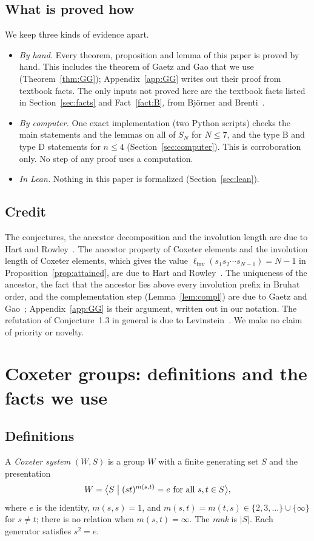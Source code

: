 \documentclass[11pt]{amsart}
\theoremstyle{definition}
\theoremstyle{remark}
\numberwithin{equation}{section}
\newcommand{\linv}{\ell_{\mathrm{inv}}}
\newcommand{\abs}[1]{\lvert #1\rvert}
\begin{document}
\subsection{What is proved how}
We keep three kinds of evidence apart.
\begin{itemize}
\item \emph{By hand.} Every theorem, proposition and lemma of this paper is proved by hand. This includes the theorem of Gaetz and Gao that we use (Theorem~\ref{thm:GG}); Appendix~\ref{app:GG} writes out their proof from textbook facts. The only inputs not proved here are the textbook facts listed in Section~\ref{sec:facts} and Fact~\ref{fact:B}, from Bj\"orner and Brenti~\cite{BB}.
\item \emph{By computer.} One exact implementation (two Python scripts) checks the main statements and the lemmas on all of \(S_N\) for \(N\le7\), and the type B and type D statements for \(n\le4\) (Section~\ref{sec:computer}). This is corroboration only. No step of any proof uses a computation.
\item \emph{In Lean.} Nothing in this paper is formalized (Section~\ref{sec:lean}).
\end{itemize}

\subsection{Credit}
The conjectures, the ancestor decomposition and the involution length are due to Hart and Rowley~\cite{HR}. The ancestor property of Coxeter elements and the involution length of Coxeter elements, which gives the value \(\linv(s_1s_2\cdots s_{N-1})=N-1\) in Proposition~\ref{prop:attained}, are due to Hart and Rowley~\cite[Prop.~2.2 and Prop.~2.5]{HR}. The uniqueness of the ancestor, the fact that the ancestor lies above every involution prefix in Bruhat order, and the complementation step (Lemma~\ref{lem:compl}) are due to Gaetz and Gao~\cite{GG}; Appendix~\ref{app:GG} is their argument, written out in our notation. The refutation of Conjecture~1.3 in general is due to Levinstein~\cite{Lev}. We make no claim of priority or novelty.

\section{Coxeter groups: definitions and the facts we use}\label{sec:coxeter}

\subsection{Definitions}
A \emph{Coxeter system} \((W,S)\) is a group \(W\) with a finite generating set \(S\) and the presentation
\begin{equation}\label{eq:presentation}
W=\bigl\langle S \bigm| (st)^{m(s,t)}=e \text{ for all } s,t\in S\bigr\rangle,
\end{equation}
where \(e\) is the identity, \(m(s,s)=1\), and \(m(s,t)=m(t,s)\in\{2,3,\dots\}\cup\{\infty\}\) for \(s\neq t\); there is no relation when \(m(s,t)=\infty\). The \emph{rank} is \(\abs{S}\). Each generator satisfies \(s^2=e\).
\end{document}
